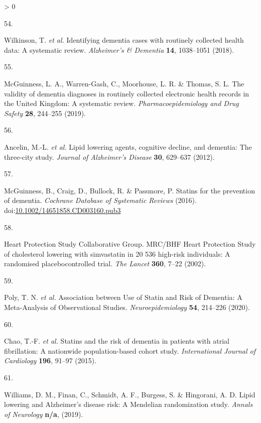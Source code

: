 \documentclass[a4paper, twoside]{templates/ociamthesis}
\newlength{\cslhangindent}
\newlength{\csllabelwidth}
\newenvironment{CSLReferences}[3] %
 {%
  \setlength{\parindent}{0pt}
  \ifodd #1 \everypar{\setlength{\hangindent}{\cslhangindent}}\ignorespaces\fi
  \ifnum #2 > 0
  \setlength{\parskip}{#2\baselineskip}
  \fi
 }%
 {}
\newcommand{\CSLLeftMargin}[1]{\parbox[t]{\maxof{\widthof{#1}}{\csllabelwidth}}{#1}}
\newcommand{\CSLRightInline}[1]{\parbox[t]{\linewidth - \csllabelwidth}{#1}}
\begin{document}
\begin{CSLReferences}{0}{0}
\leavevmode\hypertarget{ref-wilkinson2018a}{}%
\CSLLeftMargin{54. }
\CSLRightInline{Wilkinson, T. \emph{et al.} Identifying dementia cases with routinely collected health data: {A} systematic review. \emph{Alzheimer's \& Dementia} \textbf{14}, 1038--1051 (2018).}

\leavevmode\hypertarget{ref-mcguinness2019c}{}%
\CSLLeftMargin{55. }
\CSLRightInline{McGuinness, L. A., Warren-Gash, C., Moorhouse, L. R. \& Thomas, S. L. The validity of dementia diagnoses in routinely collected electronic health records in the {United Kingdom}: {A} systematic review. \emph{Pharmacoepidemiology and Drug Safety} \textbf{28}, 244--255 (2019).}

\leavevmode\hypertarget{ref-ancelin2012}{}%
\CSLLeftMargin{56. }
\CSLRightInline{Ancelin, M.-L. \emph{et al.} Lipid lowering agents, cognitive decline, and dementia: The three-city study. \emph{Journal of Alzheimer's Disease} \textbf{30}, 629--637 (2012).}

\leavevmode\hypertarget{ref-mcguinness2016a}{}%
\CSLLeftMargin{57. }
\CSLRightInline{McGuinness, B., Craig, D., Bullock, R. \& Passmore, P. Statins for the prevention of dementia. \emph{Cochrane Database of Systematic Reviews} (2016). doi:\href{https://doi.org/10.1002/14651858.CD003160.pub3}{10.1002/14651858.CD003160.pub3}}

\leavevmode\hypertarget{ref-heartprotectionstudycollaborativegroup2002}{}%
\CSLLeftMargin{58. }
\CSLRightInline{Heart Protection Study Collaborative Group. {MRC}/{BHF Heart Protection Study} of cholesterol lowering with simvastatin in 20 536 high-risk individuals: A randomised placebocontrolled trial. \emph{The Lancet} \textbf{360}, 7--22 (2002).}

\leavevmode\hypertarget{ref-poly2020}{}%
\CSLLeftMargin{59. }
\CSLRightInline{Poly, T. N. \emph{et al.} Association between {Use} of {Statin} and {Risk} of {Dementia}: {A Meta}-{Analysis} of {Observational Studies}. \emph{Neuroepidemiology} \textbf{54}, 214--226 (2020).}

\leavevmode\hypertarget{ref-chao2015}{}%
\CSLLeftMargin{60. }
\CSLRightInline{Chao, T.-F. \emph{et al.} Statins and the risk of dementia in patients with atrial fibrillation: {A} nationwide population-based cohort study. \emph{International Journal of Cardiology} \textbf{196}, 91--97 (2015).}

\leavevmode\hypertarget{ref-williams}{}%
\CSLLeftMargin{61. }
\CSLRightInline{Williams, D. M., Finan, C., Schmidt, A. F., Burgess, S. \& Hingorani, A. D. Lipid lowering and {Alzheimer}'s disease risk: A {Mendelian} randomization study. \emph{Annals of Neurology} \textbf{n/a}, (2019).}


\end{CSLReferences}
\end{document}
